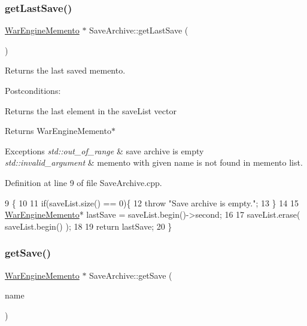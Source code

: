 \subsubsection{\texorpdfstring{get\+Last\+Save()}{getLastSave()}}
{\footnotesize\ttfamily \hyperlink{classWarEngineMemento}{War\+Engine\+Memento} $\ast$ Save\+Archive\+::get\+Last\+Save (\begin{DoxyParamCaption}{ }\end{DoxyParamCaption})}



Returns the last saved memento. 

Postconditions\+:
\begin{DoxyItemize}
\item Returns the last element in the save\+List vector
\end{DoxyItemize}

\begin{DoxyReturn}{Returns}
War\+Engine\+Memento$\ast$ 
\end{DoxyReturn}

\begin{DoxyExceptions}{Exceptions}
{\em std\+::out\+\_\+of\+\_\+range} & save archive is empty \\
\hline
{\em std\+::invalid\+\_\+argument} & memento with given name is not found in memento list. \\
\hline
\end{DoxyExceptions}


Definition at line 9 of file Save\+Archive.\+cpp.


\begin{DoxyCode}
9                                            \{
10     
11     \textcolor{keywordflow}{if}(saveList.size() == 0)\{
12         \textcolor{keywordflow}{throw} \textcolor{stringliteral}{"Save archive is empty."};
13     \}
14 
15     \hyperlink{classWarEngineMemento}{WarEngineMemento}* lastSave = saveList.begin()->second;
16 
17     saveList.erase( saveList.begin() );
18 
19     \textcolor{keywordflow}{return} lastSave;
20 \}
\end{DoxyCode}
\mbox{\label{classSaveArchive_ad65ce77b8a9027b4e4a5d67ca1f06877}} 
\subsubsection{\texorpdfstring{get\+Save()}{getSave()}}
{\footnotesize\ttfamily \hyperlink{classWarEngineMemento}{War\+Engine\+Memento} $\ast$ Save\+Archive\+::get\+Save (\begin{DoxyParamCaption}\item[{std\+::string}]{name }\end{DoxyParamCaption})}




